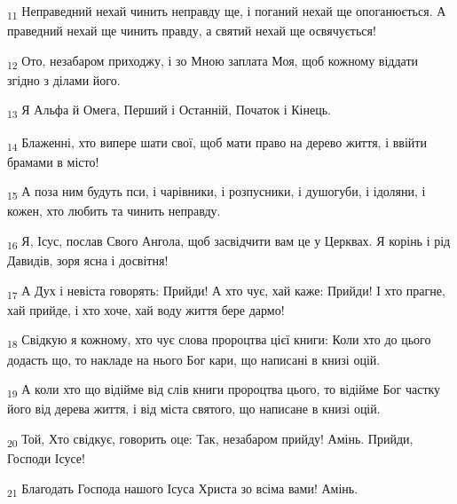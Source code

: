 \begin{tcolorbox}
\textsubscript{11} Неправедний нехай чинить неправду ще, і поганий нехай ще опоганюється. А праведний нехай ще чинить правду, а святий нехай ще освячується!
\end{tcolorbox}
\begin{tcolorbox}
\textsubscript{12} Ото, незабаром приходжу, і зо Мною заплата Моя, щоб кожному віддати згідно з ділами його.
\end{tcolorbox}
\begin{tcolorbox}
\textsubscript{13} Я Альфа й Омега, Перший і Останній, Початок і Кінець.
\end{tcolorbox}
\begin{tcolorbox}
\textsubscript{14} Блаженні, хто випере шати свої, щоб мати право на дерево життя, і ввійти брамами в місто!
\end{tcolorbox}
\begin{tcolorbox}
\textsubscript{15} А поза ним будуть пси, і чарівники, і розпусники, і душогуби, і ідоляни, і кожен, хто любить та чинить неправду.
\end{tcolorbox}
\begin{tcolorbox}
\textsubscript{16} Я, Ісус, послав Свого Ангола, щоб засвідчити вам це у Церквах. Я корінь і рід Давидів, зоря ясна і досвітня!
\end{tcolorbox}
\begin{tcolorbox}
\textsubscript{17} А Дух і невіста говорять: Прийди! А хто чує, хай каже: Прийди! І хто прагне, хай прийде, і хто хоче, хай воду життя бере дармо!
\end{tcolorbox}
\begin{tcolorbox}
\textsubscript{18} Свідкую я кожному, хто чує слова пророцтва цієї книги: Коли хто до цього додасть що, то накладе на нього Бог кари, що написані в книзі оцій.
\end{tcolorbox}
\begin{tcolorbox}
\textsubscript{19} А коли хто що відійме від слів книги пророцтва цього, то відійме Бог частку його від дерева життя, і від міста святого, що написане в книзі оцій.
\end{tcolorbox}
\begin{tcolorbox}
\textsubscript{20} Той, Хто свідкує, говорить оце: Так, незабаром прийду! Амінь. Прийди, Господи Ісусе!
\end{tcolorbox}
\begin{tcolorbox}
\textsubscript{21} Благодать Господа нашого Ісуса Христа зо всіма вами! Амінь.
\end{tcolorbox}
